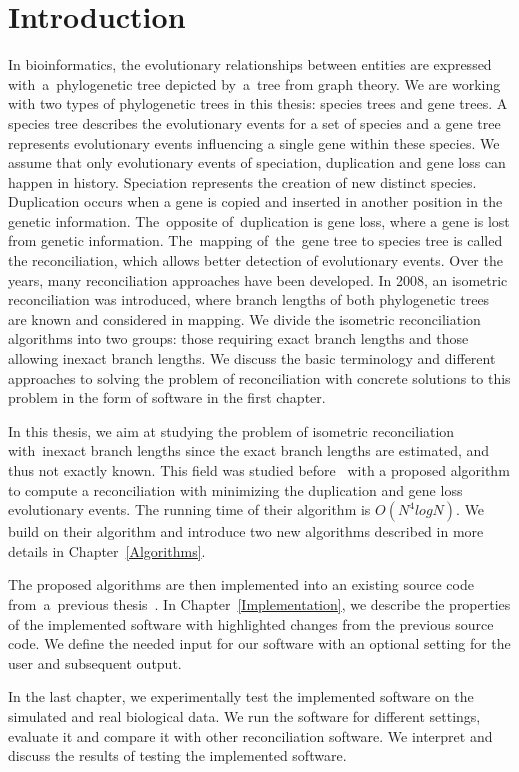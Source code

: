\chapter*{Introduction}

In bioinformatics, the evolutionary relationships between entities are expressed with~a~phylogenetic tree depicted by~a~tree from graph theory. We are working with two types of phylogenetic trees in this thesis: species trees and gene trees. A species tree describes the evolutionary events for a set of species and a gene tree represents evolutionary events influencing a single gene within these species. We assume that only evolutionary events of speciation, duplication and gene loss can happen in history. Speciation represents the creation of new distinct species. Duplication occurs when a gene is copied and inserted in another position in the genetic information. The~opposite of~duplication is gene loss, where a gene is lost from genetic information. The~mapping of~the~gene tree to species tree is called the reconciliation, which allows better detection of evolutionary events. Over the years, many reconciliation approaches have been developed. In 2008, an isometric reconciliation was introduced, where branch lengths of both phylogenetic trees are known and considered in mapping. We divide the isometric reconciliation algorithms into two groups: those requiring exact branch lengths and those allowing inexact branch lengths. We discuss the basic terminology and different approaches to solving the problem of reconciliation with concrete solutions to this problem in the form of software in the first chapter.

In this thesis, we aim at studying the problem of isometric reconciliation with~inexact branch lengths since the exact branch lengths are estimated, and thus not exactly known. This field was studied before~\cite{chladek_thesis} with a proposed algorithm to compute a reconciliation with minimizing the duplication and gene loss evolutionary events. The running time of their algorithm is $O(N^4 log N)$. We build on their algorithm and introduce two new algorithms described in more details in Chapter~\ref{Algorithms}.

The proposed algorithms are then implemented into an existing source code from~a~previous thesis~\cite{chladek_thesis}. In Chapter~\ref{Implementation}, we describe the properties of the implemented software with highlighted changes from the previous source code. We define the needed input for our software with an optional setting for the user and subsequent output.

In the last chapter, we experimentally test the implemented software on the simulated and real biological data. We run the software for different settings, evaluate it and compare it with other reconciliation software. We interpret and discuss the results of testing the implemented software.


